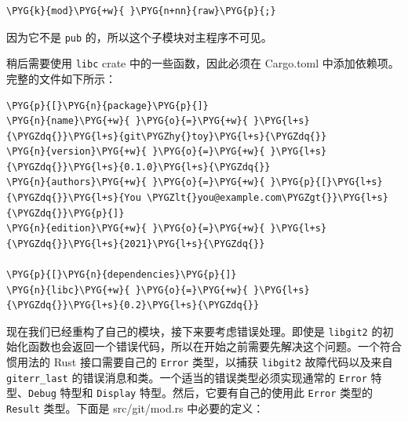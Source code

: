 \begin{Verbatim}[commandchars=\\\{\},breaklines=true,breakanywhere=true,fontsize=\codefont,xleftmargin=17bp]
\PYG{k}{mod}\PYG{+w}{ }\PYG{n+nn}{raw}\PYG{p}{;}
\end{Verbatim}

因为它不是 \texttt{pub} 的，所以这个子模块对主程序不可见。

稍后需要使用 \texttt{libc} crate 中的一些函数，因此必须在 Cargo.toml 中添加依赖项。完整的文件如下所示：

\begin{Verbatim}[commandchars=\\\{\},breaklines=true,breakanywhere=true,fontsize=\codefont,xleftmargin=17bp]
\PYG{p}{[}\PYG{n}{package}\PYG{p}{]}
\PYG{n}{name}\PYG{+w}{ }\PYG{o}{=}\PYG{+w}{ }\PYG{l+s}{\PYGZdq{}}\PYG{l+s}{git\PYGZhy{}toy}\PYG{l+s}{\PYGZdq{}}
\PYG{n}{version}\PYG{+w}{ }\PYG{o}{=}\PYG{+w}{ }\PYG{l+s}{\PYGZdq{}}\PYG{l+s}{0.1.0}\PYG{l+s}{\PYGZdq{}}
\PYG{n}{authors}\PYG{+w}{ }\PYG{o}{=}\PYG{+w}{ }\PYG{p}{[}\PYG{l+s}{\PYGZdq{}}\PYG{l+s}{You \PYGZlt{}you@example.com\PYGZgt{}}\PYG{l+s}{\PYGZdq{}}\PYG{p}{]}
\PYG{n}{edition}\PYG{+w}{ }\PYG{o}{=}\PYG{+w}{ }\PYG{l+s}{\PYGZdq{}}\PYG{l+s}{2021}\PYG{l+s}{\PYGZdq{}}

\PYG{p}{[}\PYG{n}{dependencies}\PYG{p}{]}
\PYG{n}{libc}\PYG{+w}{ }\PYG{o}{=}\PYG{+w}{ }\PYG{l+s}{\PYGZdq{}}\PYG{l+s}{0.2}\PYG{l+s}{\PYGZdq{}}
\end{Verbatim}

现在我们已经重构了自己的模块，接下来要考虑错误处理。即使是 \texttt{libgit2} 的初始化函数也会返回一个错误代码，所以在开始之前需要先解决这个问题。一个符合惯用法的 Rust 接口需要自己的 \texttt{Error} 类型，以捕获 \texttt{libgit2} 故障代码以及来自 \texttt{giterr\_last} 的错误消息和类。一个适当的错误类型必须实现通常的 \texttt{Error} 特型、\texttt{Debug} 特型和 \texttt{Display} 特型。然后，它要有自己的使用此 \texttt{Error} 类型的 \texttt{Result} 类型。下面是 src/git/mod.rs 中必要的定义：


